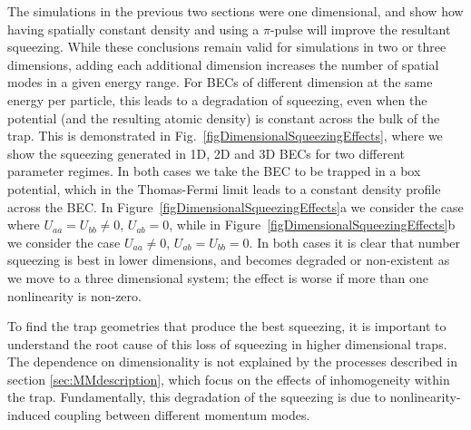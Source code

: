 \documentclass{iopart}
\begin{document}
The simulations in the previous two sections were one dimensional, and show how having spatially constant density and using a $\pi$-pulse will improve the resultant squeezing.  While these conclusions remain valid for simulations in two or three dimensions, adding each additional dimension increases the number of spatial modes in a given energy range.  For BECs of different dimension at the same energy per particle, this leads to a degradation of squeezing, even when the potential (and the resulting atomic density) is constant across the bulk of the trap.  This is demonstrated in Fig.~\ref{figDimensionalSqueezingEffects}, where we show the squeezing generated in 1D, 2D and 3D BECs for two different parameter regimes. In both cases we take the BEC to be trapped in a box potential, which in the Thomas-Fermi limit leads to a constant density profile across the BEC. In Figure~\ref{figDimensionalSqueezingEffects}a we consider the case where $U_{aa}=U_{bb}\neq 0$, $U_{ab}=0$, while in Figure~\ref{figDimensionalSqueezingEffects}b we consider the case $U_{aa}\neq 0$, $U_{ab}=U_{bb}=0$. In both cases it is clear that number squeezing is best in lower dimensions, and becomes degraded or non-existent as we move to a three dimensional system; the effect is worse if more than one nonlinearity is non-zero.

To find the trap geometries that produce the best squeezing, it is important to understand the root cause of this loss of squeezing in higher dimensional traps.  The dependence on dimensionality is not explained by the processes described in section \ref{sec:MMdescription}, which focus on the effects of inhomogeneity within the trap.  Fundamentally, this degradation of the squeezing is due to nonlinearity-induced coupling between different momentum modes.  
\end{document}
